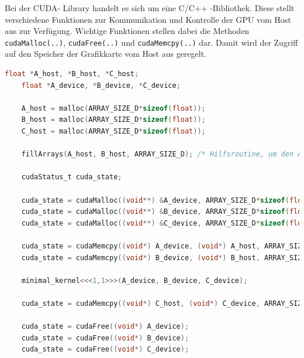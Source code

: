\documentclass[../main.tex]{subfiles}
\begin{document}
Bei der CUDA- Library handelt es sich um eine C/C++ -Bibliothek. Diese stellt verschiedene Funktionen zur Kommunikation und Kontrolle der GPU vom Host aus zur Verfügung. Wichtige Funktionen stellen dabei die Methoden \texttt{cudaMalloc(..)}, \texttt{cudaFree(..)} und \texttt{cudaMemcpy(..)} dar. Damit wird der Zugriff auf den Speicher der Grafikkarte vom Host aus geregelt. \par 
\begin{lstlisting}[language=C, caption=Aufruf des minimalen Kernels mit Speicherzugriff vom Host, captionpos=b, label=listing:min_kernel_host, breaklines]
	float *A_host, *B_host, *C_host;
	float *A_device, *B_device, *C_device;
	
	A_host = malloc(ARRAY_SIZE_D*sizeof(float));
	B_host = malloc(ARRAY_SIZE_D*sizeof(float));
	C_host = malloc(ARRAY_SIZE_D*sizeof(float));
	
	fillArrays(A_host, B_host, ARRAY_SIZE_D); /* Hilfsroutine, um den Arrays Werte zuzuweisen */
	
	cudaStatus_t cuda_state;
	
	cuda_state = cudaMalloc((void**) &A_device, ARRAY_SIZE_D*sizeof(float));
	cuda_state = cudaMalloc((void**) &B_device, ARRAY_SIZE_D*sizeof(float));
	cuda_state = cudaMalloc((void**) &C_device, ARRAY_SIZE_D*sizeof(float));
	
	cuda_state = cudaMemcpy((void*) A_device, (void*) A_host, ARRAY_SIZE_D*sizeof(float), cudaMemcpyHostToDevice);
	cuda_state = cudaMemcpy((void*) B_device, (void*) B_host, ARRAY_SIZE_D*sizeof(float), cudaMemcpyHostToDevice);
						
	minimal_kernel<<<1,1>>>(A_device, B_device, C_device);
	
	cuda_state = cudaMemcpy((void*) C_host, (void*) C_device, ARRAY_SIZE_D*sizeof(float), cudaMemcpyDeviceToHost);
	
	cuda_state = cudaFree((void*) A_device);
	cuda_state = cudaFree((void*) B_device);
	cuda_state = cudaFree((void*) C_device);
\end{lstlisting}
\end{document}
